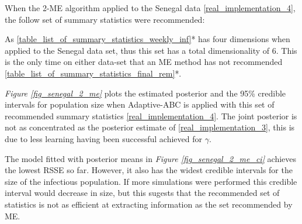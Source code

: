 \documentclass[11pt,a4paper]{article}
\theoremstyle{break}
\begin{document}
  \par When the 2-ME algorithm applied to the Senegal data \ref{real_implementation_4}, the follow set of summary statistics were recommended:

  \begin{center}
  \end{center}

  \noindent As \ref{table_list_of_summary_statistics_weekly_inf}* has four dimensions when applied to the Senegal data set, thus this set has a total dimensionality of 6. This is the only time on either data-set that an ME method has not recommended \ref{table_list_of_summary_statistics_final_rem}*.

  \par \textit{Figure \ref{fig_senegal_2_me}} plots the estimated posterior and the 95\% credible intervals for population size when Adaptive-ABC is applied with this set of recommended summary statistics \ref{real_implementation_4}. The joint posterior is not as concentrated as the posterior estimate of \ref{real_implementation_3}, this is due to less learning having been successful achieved for $\gamma$.

  \par The model fitted with posterior means in \textit{Figure \ref{fig_senegal_2_me_ci}} achieves the lowest RSSE so far. However, it also has the widest credible intervals for the size of the infectious population. If more simulations were performed this credible interval would decrease in size, but this sugests that the recommended set of statistics is not as efficient at extracting information as the set recommended by ME.
\end{document}
